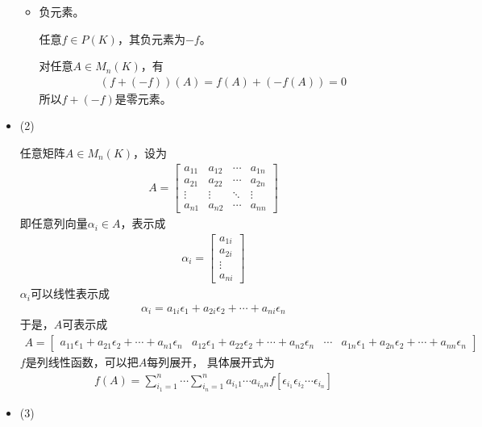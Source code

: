 \documentclass{article}
\begin{document}
\begin{itemize}
\begin{itemize}
          \item 负元素。

                任意$f \in P(K)$，其负元素为$-f$。

                对任意$A \in M_n(K)$，有
                \begin{align*}
                  (f + (- f))(A) = f(A) + (- f(A)) = 0
                \end{align*}
                所以$f + (- f)$是零元素。
        \end{itemize}

  \item (2)

        任意矩阵$A \in M_n(K)$，设为
        \begin{align*}
          A = \begin{bmatrix}
                a_{11} & a_{12} & \cdots & a_{1n} \\
                a_{21} & a_{22} & \cdots & a_{2n} \\
                \vdots & \vdots & \ddots & \vdots \\
                a_{n1} & a_{n2} & \cdots & a_{nn}
              \end{bmatrix}
        \end{align*}
        即任意列向量$\alpha_i \in A$，表示成
        \begin{align*}
          \alpha_i = \begin{bmatrix}
                       a_{1i} \\
                       a_{2i} \\
                       \vdots \\
                       a_{ni}
                     \end{bmatrix}
        \end{align*}
        $\alpha_i$可以线性表示成
        \begin{align*}
          \alpha_i = a_{1i} \epsilon_1 + a_{2i} \epsilon_2 + \cdots + a_{ni} \epsilon_n
        \end{align*}
        于是，$A$可表示成
        \begin{align*}
          A = \begin{bmatrix}
                a_{11} \epsilon_1 + a_{21} \epsilon_2 + \cdots + a_{n1} \epsilon_n &
                a_{12} \epsilon_1 + a_{22} \epsilon_2 + \cdots + a_{n2} \epsilon_n &
                \cdots                                                             &
                a_{1n} \epsilon_1 + a_{2n} \epsilon_2 + \cdots + a_{nn} \epsilon_n
              \end{bmatrix}
        \end{align*}
        $f$是列线性函数，可以把$A$每列展开，
        具体展开式为
        \begin{align*}
          f(A)
          = \sum\limits_{i_1 = 1}^n \cdots \sum\limits_{i_n = 1}^n a_{i_1 1} \cdots a_{i_n n}
          f[\epsilon_{i_1}  \epsilon_{i_2}  \cdots  \epsilon_{i_n}]
        \end{align*}

  \item (3)

\end{itemize}
\end{document}

